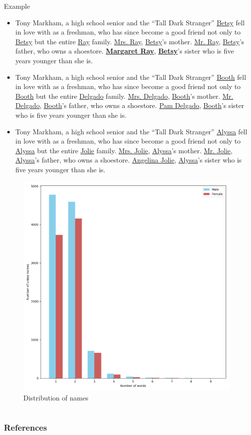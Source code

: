 \message{ !name(presentation.tex)}\documentclass[10pt]{beamer}
\begin{document}
\begin{frame}{Example}
  \begin{itemize}
  \item Tony Markham, a high school senior and the ``Tall Dark Stranger'' \underline{Betsy} fell in love with as a freshman, who has since become a good friend not only to \underline{Betsy} but the entire \underline{Ray} family. \underline{Mrs. Ray}, \underline{Betsy}'s mother. \underline{Mr. Ray}, \underline{Betsy}'s father, who owns a shoestore. \textbf{\underline{Margaret Ray}}, \textbf{\underline{Betsy}}'s sister who is five years younger than she is.
  
  \item Tony Markham, a high school senior and the ``Tall Dark Stranger'' \underline{Booth} fell in love with as a freshman, who has since become a good friend not only to \underline{Booth} but the entire \underline{Delgado} family. \underline{Mrs. Delgado}, \underline{Booth}'s mother. \underline{Mr. Delgado}, \underline{Booth}'s father, who owns a shoestore. \underline{Pam Delgado}, \underline{Booth}'s sister who is five years younger than she is.

  \item Tony Markham, a high school senior and the ``Tall Dark Stranger'' \underline{Alyssa} fell in love with as a freshman, who has since become a good friend not only to \underline{Alyssa} but the entire \underline{Jolie} family. \underline{Mrs. Jolie}, \underline{Alyssa}'s mother. \underline{Mr. Jolie}, \underline{Alyssa}'s father, who owns a shoestore. \underline{Angelina Jolie}, \underline{Alyssa}'s sister who is five years younger than she is.
  \end{itemize}    

\end{frame}

\begin{frame}
  \begin{figure}
    \centering
    \includegraphics[width=.7\textwidth]{augment_dist.png}
    \caption{Distribution of names}
    \label{fig:dist_names}
  \end{figure}
\end{frame}

\section{}
\begin{frame}
  \frametitle{References}
  
  
\end{frame}
\end{document}
